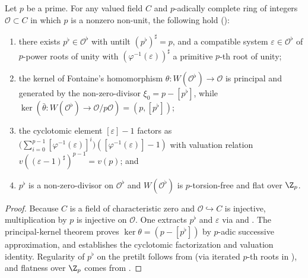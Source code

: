 \begin{theorem}
\label{thm:tilt-structure}
Let $p$ be a prime. For any valued field $C$ and $p$-adically complete ring of
integers $\mathcal{O} \subset C$ in which $p$ is a nonzero non-unit, the
following hold ():
\begin{enumerate}
  \item there exists $p^\flat \in \mathcal{O}^\flat$ with untilt $(p^\flat)^\sharp = p$,
  and a compatible system $\varepsilon \in \mathcal{O}^\flat$ of $p$-power
  roots of unity with $(\varphi^{-1}(\varepsilon))^\sharp$ a primitive $p$-th
  root of unity;
  \item the kernel of Fontaine's homomorphism $\theta : W(\mathcal{O}^\flat) \to \mathcal{O}$
  is principal and generated by the non-zero-divisor $\xi_0 = p - [p^\flat]$,
  while $\ker(\bar\theta : W(\mathcal{O}^\flat) \to \mathcal{O}/p\mathcal{O}) = (p, [p^\flat])$;
  \item the cyclotomic element $[\varepsilon] - 1$ factors as
  $\bigl(\sum_{i=0}^{p-1} [\varphi^{-1}(\varepsilon)]^i\bigr)([\varphi^{-1}(\varepsilon)] - 1)$
  with valuation relation $v((\varepsilon - 1)^\sharp)^{p-1} = v(p)$; and
  \item $p^\flat$ is a non-zero-divisor on $\mathcal{O}^\flat$ and $W(\mathcal{O}^\flat)$
  is $p$-torsion-free and flat over $\Z_p$.
\end{enumerate}
\end{theorem}

\begin{proof}
Because $C$ is a field of characteristic zero and $\mathcal{O} \hookrightarrow C$
is injective, multiplication by $p$ is injective on $\mathcal{O}$. One
extracts $p^\flat$ and $\varepsilon$ via
 and
. The principal-kernel theorem
 proves $\ker\theta = (p - [p^\flat])$
by $p$-adic successive approximation, and
 establishes the cyclotomic factorization
and valuation identity. Regularity of $p^\flat$ on the pretilt follows from
 (via iterated $p$-th roots in
), and flatness over $\Z_p$
comes from .
\end{proof}

